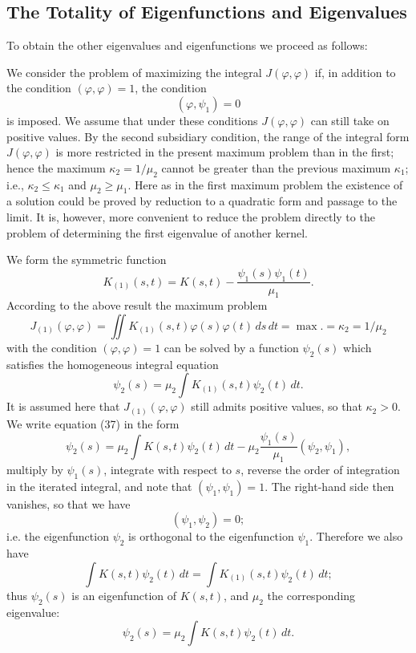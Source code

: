 \subsection{The Totality of Eigenfunctions and Eigenvalues}
To obtain the other eigenvalues and eigenfunctions we proceed as follows:

We consider the problem of maximizing the integral $J(\varphi,\varphi)$ if, in addition to the condition $(\varphi,\varphi)=1$, the condition
\[
(\varphi,\psi_1)=0
\]
is imposed. We assume that under these conditions $J(\varphi,\varphi)$ can still take on positive values. By the second subsidiary condition, the range of the integral form $J(\varphi,\varphi)$ is more restricted in the present maximum problem than in the first; hence the maximum $\kappa_2=1/\mu_2$ cannot be greater than the previous maximum $\kappa_1$; i.e., $\kappa_2\le\kappa_1$ and $\mu_2\ge\mu_1$. Here as in the first maximum problem the existence of a solution could be proved by reduction to a quadratic form and passage to the limit. It is, however, more convenient to reduce the problem directly to the problem of determining the first eigenvalue of another kernel.

We form the symmetric function
\begin{equation}\tag{35}
K_{(1)}(s,t)=K(s,t)-\frac{\psi_1(s)\psi_1(t)}{\mu_1}.
\end{equation}
According to the above result the maximum problem
\begin{equation}\tag{36}
J_{(1)}(\varphi,\varphi)=\iint K_{(1)}(s,t)\varphi(s)\varphi(t)\,ds\,dt
=\max.=\kappa_2=1/\mu_2
\end{equation}
with the condition $(\varphi,\varphi)=1$ can be solved by a function $\psi_2(s)$ which satisfies the homogeneous integral equation
\begin{equation}\tag{37}
\psi_2(s)=\mu_2\int K_{(1)}(s,t)\psi_2(t)\,dt.
\end{equation}
It is assumed here that $J_{(1)}(\varphi,\varphi)$ still admits positive values, so that $\kappa_2>0$. We write equation (37) in the form
\[
\psi_2(s)=\mu_2\int K(s,t)\psi_2(t)\,dt
-\mu_2\frac{\psi_1(s)}{\mu_1}(\psi_2,\psi_1),
\]
multiply by $\psi_1(s)$, integrate with respect to $s$, reverse the order of integration in the iterated integral, and note that $(\psi_1,\psi_1)=1$. The right-hand side then vanishes, so that we have
\begin{equation}\tag{38}
(\psi_1,\psi_2)=0;
\end{equation}
i.e. the eigenfunction $\psi_2$ is orthogonal to the eigenfunction $\psi_1$. Therefore we also have
\begin{equation}\tag{39}
\int K(s,t)\psi_2(t)\,dt=\int K_{(1)}(s,t)\psi_2(t)\,dt;
\end{equation}
thus $\psi_2(s)$ is an eigenfunction of $K(s,t)$, and $\mu_2$ the corresponding eigenvalue:
\begin{equation}\tag{40}
\psi_2(s)=\mu_2\int K(s,t)\psi_2(t)\,dt.
\end{equation}


